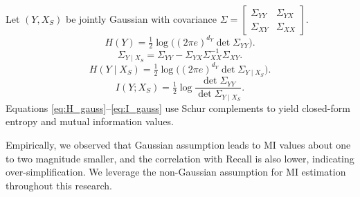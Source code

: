 \documentclass{article}
\theoremstyle{plain}
\theoremstyle{definition}
\theoremstyle{remark}
\begin{document}
Let \((Y,X_S)\) be jointly Gaussian with covariance
\(\Sigma=\begin{bmatrix}\Sigma_{YY} & \Sigma_{YX}\\ \Sigma_{XY} & \Sigma_{XX}\end{bmatrix}\).
\begin{equation}
H(Y)=\tfrac12\log\big((2\pi e)^{d_Y}\det\Sigma_{YY}\big).
\label{eq:H_gauss}
\end{equation}
\begin{equation}
\Sigma_{Y\mid X_S}=\Sigma_{YY}-\Sigma_{YX}\Sigma_{XX}^{-1}\Sigma_{XY}.
\label{eq:schur}
\end{equation}
\begin{equation}
H(Y\mid X_S)=\tfrac12\log\big((2\pi e)^{d_Y}\det\Sigma_{Y\mid X_S}\big).
\label{eq:H_cond_gauss}
\end{equation}
\begin{equation}
I(Y;X_S)=\tfrac12\log\frac{\det\Sigma_{YY}}{\det\Sigma_{Y\mid X_S}}.
\label{eq:I_gauss}
\end{equation}
Equations \eqref{eq:H_gauss}–\eqref{eq:I_gauss} use Schur complements to yield closed-form entropy and mutual information values.

Empirically, we observed that Gaussian assumption leads to MI values about one to two magnitude smaller, and the correlation with Recall is also lower, indicating over-simplification. We leverage the non-Gaussian assumption for MI estimation throughout this research.
\end{document}
